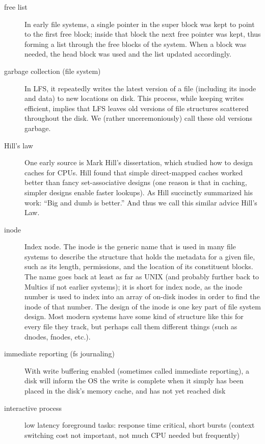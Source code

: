 \begin{description}
\item[free list] In early file systems, a single pointer in the super block was kept to point to the first free block; inside that block the next free pointer was kept, thus forming a list through the free blocks of the system. When a block was needed, the head block was used and the list updated accordingly.

\item[garbage collection (file system)] In LFS, it repeatedly writes the latest version of a file (including its inode and data) to new locations on disk. This process, while keeping writes efficient, implies that LFS leaves old versions of file structures scattered throughout the disk. We (rather unceremoniously) call these old versions garbage.

\item[Hill's law] One early source is Mark Hill's dissertation, which studied how to design caches for CPUs. Hill found that simple direct-mapped caches worked better than fancy set-associative designs (one reason is that in caching, simpler designs enable faster lookups). As Hill succinctly summarized
  his work: ``Big and dumb is better.'' And thus we call this similar advice Hill's Law.

\item[inode] Index node. The inode is the generic name that is used in many file systems to describe the structure that holds the metadata for a given file, such as its length, permissions, and the location of its constituent blocks. The name
goes back at least as far as UNIX (and probably further back to Multics if not earlier systems); it is short for index node, as the inode number is used to index into an array of on-disk inodes in order to find the inode of that number. The design of the inode is one key part of file system design. Most modern systems have some kind of structure like this for every file they track, but perhaps call them different things (such as dnodes, fnodes, etc.).

\item[immediate reporting (fs journaling)] With write buffering enabled (sometimes called immediate reporting), a disk will inform the OS the write is complete when it simply has been placed in the disk’s memory cache, and has not yet reached disk

\item[interactive process] low latency foreground tasks: response time critical, short bursts (context switching cost not important, not much CPU needed but frequently)


\end{description}
